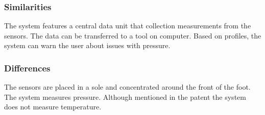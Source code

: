 \subsubsection{Similarities}
The system features a central data unit that collection measurements from the sensors. The data can be transferred to a tool on computer. Based on profiles, the system can warn the user about issues with pressure. 
\subsubsection{Differences}
The sensors are placed in a sole and concentrated around the front of the foot. The system measures pressure. Although mentioned in the patent the system does not measure temperature.
